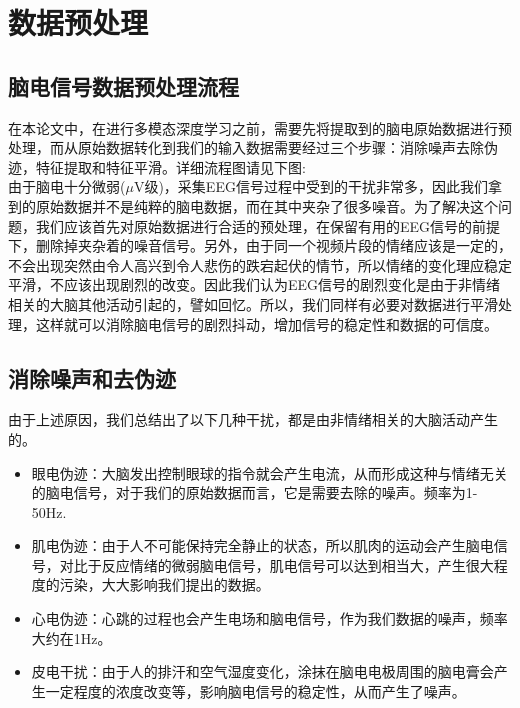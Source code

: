 
\chapter{数据预处理}
\label{chap:chap3}

\section{脑电信号数据预处理流程}
	在本论文中，在进行多模态深度学习之前，需要先将提取到的脑电原始数据进行预处理，而从原始数据转化到我们的输入数据需要经过三个步骤：消除噪声去除伪迹，特征提取和特征平滑。详细流程图请见下图:\\
	由于脑电十分微弱($\mu$V级)，采集EEG信号过程中受到的干扰非常多，因此我们拿到的原始数据并不是纯粹的脑电数据，而在其中夹杂了很多噪音。为了解决这个问题，我们应该首先对原始数据进行合适的预处理，在保留有用的EEG信号的前提下，删除掉夹杂着的噪音信号。另外，由于同一个视频片段的情绪应该是一定的，不会出现突然由令人高兴到令人悲伤的跌宕起伏的情节，所以情绪的变化理应稳定平滑，不应该出现剧烈的改变。因此我们认为EEG信号的剧烈变化是由于非情绪相关的大脑其他活动引起的，譬如回忆。所以，我们同样有必要对数据进行平滑处理，这样就可以消除脑电信号的剧烈抖动，增加信号的稳定性和数据的可信度。
\section{消除噪声和去伪迹}
	由于上述原因，我们总结出了以下几种干扰，都是由非情绪相关的大脑活动产生的。
	\begin{itemize}
	\item 眼电伪迹：大脑发出控制眼球的指令就会产生电流，从而形成这种与情绪无关的脑电信号，对于我们的原始数据而言，它是需要去除的噪声。频率为1-50Hz.
	\item 肌电伪迹：由于人不可能保持完全静止的状态，所以肌肉的运动会产生脑电信号，对比于反应情绪的微弱脑电信号，肌电信号可以达到相当大，产生很大程度的污染，大大影响我们提出的数据。
	\item 心电伪迹：心跳的过程也会产生电场和脑电信号，作为我们数据的噪声，频率大约在1Hz。
	\item 皮电干扰：由于人的排汗和空气湿度变化，涂抹在脑电电极周围的脑电膏会产生一定程度的浓度改变等，影响脑电信号的稳定性，从而产生了噪声。
	\end{itemize}
	
